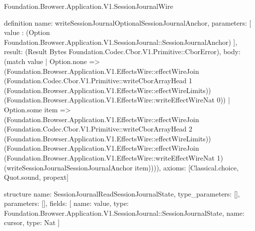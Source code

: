 \begin{lexlean}{Foundation.Browser.Application.V1.SessionJournalWire}
\begin{semanticmodule}
definition{
  name: writeSessionJournalOptionalSessionJournalAnchor,
  parameters: [
    value : (Option Foundation.Browser.Application.V1.SessionJournal::SessionJournalAnchor)
  ],
  result: (Result Bytes Foundation.Codec.Cbor.V1.Primitive::CborError),
  body: (match value
    | Option.none => (Foundation.Browser.Application.V1.EffectsWire::effectWireJoin (Foundation.Codec.Cbor.V1.Primitive::writeCborArrayHead 1 (Foundation.Browser.Application.V1.EffectsWire::effectWireLimits)) (Foundation.Browser.Application.V1.EffectsWire::writeEffectWireNat 0))
    | Option.some item => (Foundation.Browser.Application.V1.EffectsWire::effectWireJoin (Foundation.Codec.Cbor.V1.Primitive::writeCborArrayHead 2 (Foundation.Browser.Application.V1.EffectsWire::effectWireLimits)) (Foundation.Browser.Application.V1.EffectsWire::effectWireJoin (Foundation.Browser.Application.V1.EffectsWire::writeEffectWireNat 1) (writeSessionJournalSessionJournalAnchor item)))),
  axioms: [Classical.choice, Quot.sound, propext]
}

structure{
  name: SessionJournalReadSessionJournalState,
  type_parameters: [],
  parameters: [],
  fields: [
    {name: value, type: Foundation.Browser.Application.V1.SessionJournal::SessionJournalState},
    {name: cursor, type: Nat}
  ]
}


\end{semanticmodule}
\end{lexlean}
